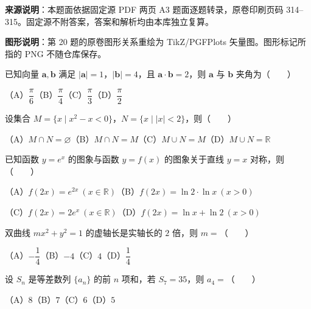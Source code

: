 


\begin{gktip}
\textbf{来源说明}：本题面依据固定源 PDF 两页 A3 题面逐题转录，原卷印刷页码 314–315。固定源不附答案，答案和解析均由本库独立复算。

\textbf{图形说明}：第 20 题的原卷图形关系重绘为 TikZ/PGFPlots 矢量图。图形标记所指的 PNG 不随仓库保存。
\end{gktip}


\begin{question}
已知向量 $\boldsymbol a,\boldsymbol b$ 满足 $|\boldsymbol a|=1$，$|\boldsymbol b|=4$，且 $\boldsymbol a\cdot\boldsymbol b=2$，则 $\boldsymbol a$ 与 $\boldsymbol b$ 夹角为\mbox{（　　）}

（A）$\dfrac\pi6$\quad（B）$\dfrac\pi4$\quad（C）$\dfrac\pi3$\quad（D）$\dfrac\pi2$

\end{question}
\begin{question}
设集合 $M=\{x\mid x^2-x<0\}$，$N=\{x\mid |x|<2\}$，则\mbox{（　　）}

（A）$M\cap N=\varnothing$\quad（B）$M\cap N=M$\quad（C）$M\cup N=M$\quad（D）$M\cup N=\mathbb R$

\end{question}
\begin{question}
已知函数 $y=e^x$ 的图象与函数 $y=f(x)$ 的图象关于直线 $y=x$ 对称，则\mbox{（　　）}

（A）$f(2x)=e^{2x}\ (x\in\mathbb R)$\quad（B）$f(2x)=\ln2\cdot\ln x\ (x>0)$

（C）$f(2x)=2e^x\ (x\in\mathbb R)$\quad（D）$f(2x)=\ln x+\ln2\ (x>0)$

\end{question}
\begin{question}
双曲线 $mx^2+y^2=1$ 的虚轴长是实轴长的 $2$ 倍，则 $m=$\mbox{（　　）}

（A）$-\dfrac14$\quad（B）$-4$\quad（C）$4$\quad（D）$\dfrac14$

\end{question}
\begin{question}
设 $S_n$ 是等差数列 $\{a_n\}$ 的前 $n$ 项和，若 $S_7=35$，则 $a_4=$\mbox{（　　）}

（A）$8$\quad（B）$7$\quad（C）$6$\quad（D）$5$

\end{question}
